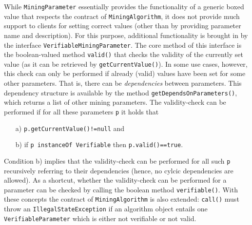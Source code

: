 \documentclass{scrartcl}
\newcommand{\class}[1]{\texttt{#1}}
\begin{document}
While \class{MiningParameter} essentially provides the functionality of a
generic boxed value that respects the contract of \class{MiningAlgorithm}, it
does not provide much support to clients for setting correct values (other
than by providing parameter name and description).
For this purpose, additional functionality is brought in by the interface
\class{VerifiableMiningParameter}. The core method of this interface is the
boolean-valued method \class{valid()} that checks the validity of the currently
set value (as it can be retrieved by \class{getCurrentValue()}). In some use
cases, however, this check can only be performed if already (valid) values have
been set for some other parameters. That is, there can be \emph{dependencies}
between parameters. This dependency structure is available by the method
\class{getDependsOnParameters()}, which returns a list of other mining
parameters.
The validity-check can be performed if for all these parameters \class{p} it holds
that
\begin{itemize}
  \item[a)] \class{p.getCurrentValue()!=null} and
  \item[b)] if \class{p instanceOf Verifiable} then \class{p.valid()==true}.
\end{itemize}
Condition b) implies that the validity-check can be performed for all such
\class{p} recursively referring to their dependencies (hence, no cylcic
dependencies are allowed). As a shortcut, whether the validity-check can be
performed for a parameter can be checked by calling the boolean method
\class{verifiable()}. With these concepts the contract of
\class{MiningAlgorithm} is also extended: \class{call()}
must throw an \class{IllegalStateException} if an algorithm object entails one
\class{VerifiableParameter} which is either not verifiable or not valid.
\end{document}
